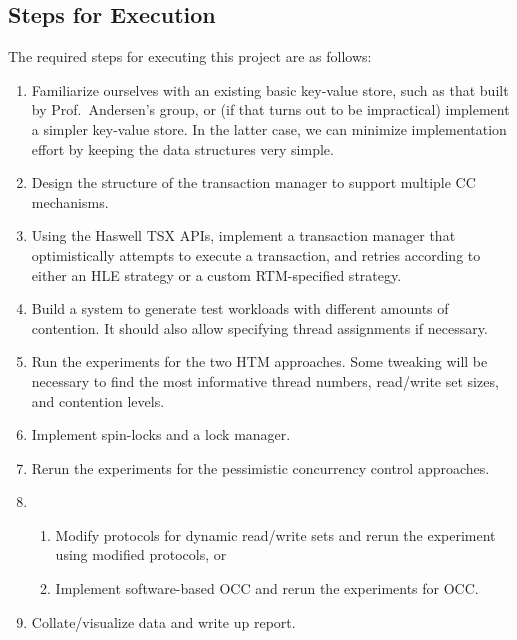 \subsection{Steps for Execution}
The required steps for executing this project are as follows:
\begin{enumerate}
\item Familiarize ourselves with an existing basic key-value store, such as that
  built by Prof.\ Andersen's group, or (if that turns out to be impractical)
  implement a simpler key-value store. In the latter case, we can
  minimize implementation effort by keeping the data structures very simple.
\item Design the structure of the transaction manager to support multiple CC mechanisms.
\item Using the Haswell TSX APIs, implement a transaction manager that optimistically attempts to execute a transaction, and retries according to either an HLE strategy or a custom RTM-specified strategy.
\item Build a system to generate test workloads with different amounts of contention. It should also allow specifying thread assignments if necessary.
\item Run the experiments for the two HTM approaches. Some tweaking will be necessary to find the most informative thread numbers, read/write set sizes, and contention levels.
\item Implement spin-locks and a lock manager.
\item Rerun the experiments for the pessimistic concurrency control approaches.
\item
  \begin{enumerate}
  \item Modify protocols for dynamic read/write sets and rerun the
    experiment using modified protocols, or
  \item Implement software-based OCC and rerun the experiments for OCC.
  \end{enumerate}
\item Collate/visualize data and write up report.
\end{enumerate}

